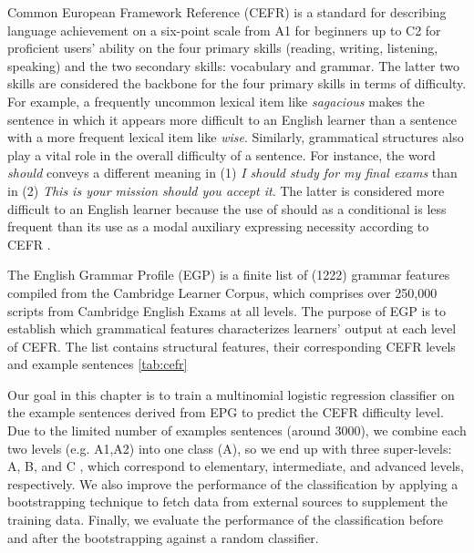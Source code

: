 Common European Framework Reference (CEFR) is a standard for describing language achievement on a six-point scale from A1 for beginners up to C2 for proficient users' ability on the four primary skills (reading, writing, listening, speaking) and the two secondary skills: vocabulary and grammar. The latter two skills are considered the backbone for the four primary skills in terms of difficulty. For example, a frequently uncommon lexical item like \emph{sagacious} makes the sentence in which it appears more difficult to an English learner than a sentence with a more frequent lexical item like \emph{wise}. Similarly, grammatical structures also play a vital role in the overall difficulty of a sentence. For instance, the word \emph{should} conveys a different meaning in (1) \emph{I should study for my final exams} than in (2) \emph{This is your mission should you accept it}. The latter is considered more difficult to an English learner because the use of should as a conditional is less frequent than its use as a modal auxiliary expressing necessity according to CEFR \citep{council2001common}. 

The English Grammar Profile (EGP) \citep{o2017english} is a finite list of (1222) grammar features compiled from the Cambridge Learner Corpus, which comprises over 250,000 scripts from Cambridge English Exams at all levels. The purpose of EGP is to establish which grammatical features characterizes learners' output at each level of CEFR. \citep{o2017english} The list contains structural features, their corresponding CEFR levels and example sentences \ref{tab:cefr}

Our goal in this chapter is to train a multinomial logistic regression classifier on the example sentences derived from EPG to predict the CEFR difficulty level. Due to the limited number of examples sentences (around 3000), we combine each two levels (e.g. A1,A2) into one class (A), so we end up with three super-levels: A, B, and C , which correspond to  elementary, intermediate, and advanced levels, respectively. We also improve the performance of the classification by applying a bootstrapping technique \citep{yarowsky_unsupervised_1995} to fetch data from external sources to supplement the training data. Finally, we evaluate the performance of the classification before and after the bootstrapping against a random classifier.


